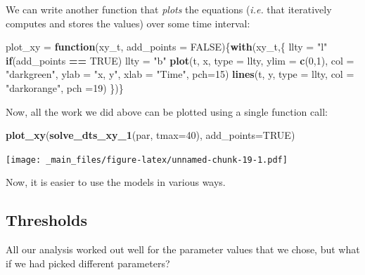 \documentclass[
]{book}
\newenvironment{Shaded}{\begin{snugshade}}{\end{snugshade}}
\newcommand{\AttributeTok}[1]{\textcolor[rgb]{0.13,0.29,0.53}{#1}}
\newcommand{\ConstantTok}[1]{\textcolor[rgb]{0.56,0.35,0.01}{#1}}
\newcommand{\ControlFlowTok}[1]{\textcolor[rgb]{0.13,0.29,0.53}{\textbf{#1}}}
\newcommand{\DecValTok}[1]{\textcolor[rgb]{0.00,0.00,0.81}{#1}}
\newcommand{\FunctionTok}[1]{\textcolor[rgb]{0.13,0.29,0.53}{\textbf{#1}}}
\newcommand{\NormalTok}[1]{#1}
\newcommand{\OtherTok}[1]{\textcolor[rgb]{0.56,0.35,0.01}{#1}}
\newcommand{\SpecialCharTok}[1]{\textcolor[rgb]{0.81,0.36,0.00}{\textbf{#1}}}
\newcommand{\StringTok}[1]{\textcolor[rgb]{0.31,0.60,0.02}{#1}}
\begin{document}
We can write another function that \emph{plots} the equations (\emph{i.e.} that iteratively computes and stores the values) over some time interval:

\begin{Shaded}
\begin{Highlighting}[]
\NormalTok{plot\_xy }\OtherTok{=} \ControlFlowTok{function}\NormalTok{(xy\_t, }\AttributeTok{add\_points =} \ConstantTok{FALSE}\NormalTok{)\{}\FunctionTok{with}\NormalTok{(xy\_t,\{}
\NormalTok{  llty }\OtherTok{=} \StringTok{"l"}
  \ControlFlowTok{if}\NormalTok{(add\_points }\SpecialCharTok{==} \ConstantTok{TRUE}\NormalTok{) llty }\OtherTok{=} \StringTok{"b"}
  \FunctionTok{plot}\NormalTok{(t, x, }\AttributeTok{type =}\NormalTok{ llty, }\AttributeTok{ylim =} \FunctionTok{c}\NormalTok{(}\DecValTok{0}\NormalTok{,}\DecValTok{1}\NormalTok{), }\AttributeTok{col =} \StringTok{"darkgreen"}\NormalTok{, }\AttributeTok{ylab =} \StringTok{"x, y"}\NormalTok{, }\AttributeTok{xlab =} \StringTok{"Time"}\NormalTok{, }\AttributeTok{pch=}\DecValTok{15}\NormalTok{)}
  \FunctionTok{lines}\NormalTok{(t, y, }\AttributeTok{type =}\NormalTok{ llty, }\AttributeTok{col =} \StringTok{"darkorange"}\NormalTok{, }\AttributeTok{pch =}\DecValTok{19}\NormalTok{)}
\NormalTok{\})\}}
\end{Highlighting}
\end{Shaded}

Now, all the work we did above can be plotted using a single function call:

\begin{Shaded}
\begin{Highlighting}[]
\FunctionTok{plot\_xy}\NormalTok{(}\FunctionTok{solve\_dts\_xy\_1}\NormalTok{(par, }\AttributeTok{tmax=}\DecValTok{40}\NormalTok{), }\AttributeTok{add\_points=}\ConstantTok{TRUE}\NormalTok{) }
\end{Highlighting}
\end{Shaded}

\texttt{[image: \_main\_files/figure-latex/unnamed-chunk-19-1.pdf]}

Now, it is easier to use the models in various ways.

\subsection{Thresholds}\label{thresholds}

All our analysis worked out well for the parameter values that we chose, but what if we had picked different parameters?
\end{document}
